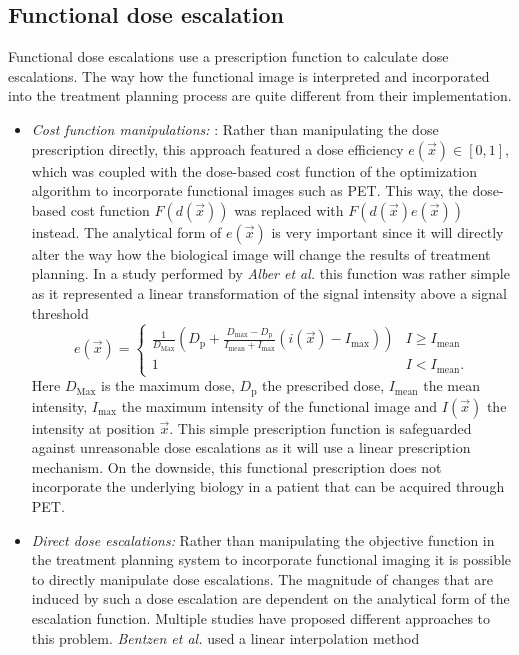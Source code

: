 \subsection{Functional dose escalation}
Functional dose escalations use a prescription function to calculate dose escalations. The way how the functional image is interpreted and incorporated into the treatment planning process are quite different from their implementation.
\begin{itemize}
\item \textit{Cost function manipulations: }:  Rather than manipulating the dose prescription directly, this approach featured a dose efficiency $e(\vec x)\in[0,1]$, which was coupled with the dose-based cost function of the optimization algorithm to incorporate functional images such as PET. This way, the dose-based cost function $F(d(\vec x))$ was replaced with $F(d(\vec x)e(\vec x))$ instead. The analytical form of $e(\vec x)$ is very important since it will directly alter the way how the biological image will change the results of treatment planning. In a study performed by \textit{Alber et al.} \cite{pmid12587912} this function was rather simple as it represented a linear transformation of the signal intensity above a signal threshold
\begin{equation}\label{eq:alber}
e(\vec x) = 
\begin{cases}
\frac{1}{D_{\mathrm{Max}}}\left(D_{\mathrm{p}} +\frac{D_{\mathrm{max}}-D_{\mathrm{p}}}{I_{\mathrm{mean}}+I_{\mathrm{max}}}(i(\vec x)-I_{\mathrm{max}})\right) & I\geq I_{\mathrm{mean}}\\
1 & I< I_{\mathrm{mean}}.
\end{cases}
\end{equation}
Here $D_{\mathrm{Max}}$ is the maximum dose, $D_{\mathrm{p}}$ the prescribed dose, $I_{\mathrm{mean}}$ the mean intensity, $I_{\mathrm{max}}$  the maximum intensity of the functional image and $I(\vec x)$ the intensity at position $\vec x$. This simple prescription function is safeguarded against unreasonable dose escalations as it will use a linear prescription mechanism. On the downside, this functional prescription does not incorporate the underlying biology in a patient that can be acquired through PET.
\item \textit{Direct dose escalations: }Rather than manipulating the objective function in the treatment planning system to incorporate functional imaging it is possible to directly manipulate dose escalations. The magnitude of changes that are induced by such a dose escalation are dependent on the analytical form of the escalation function. Multiple studies have proposed different approaches to this problem. \textit{Bentzen et al.}\cite{pmid21356478} used a linear interpolation method

\end{itemize}
